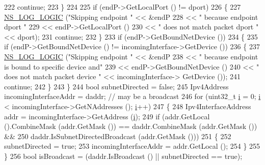\begin{DoxyCode}
222           \textcolor{keywordflow}{continue};
223         \}
224 
225       \textcolor{keywordflow}{if} (endP->GetLocalPort () != dport) 
226         \{
227           \hyperlink{group__logging_ga88acd260151caf2db9c0fc84997f45ce}{NS\_LOG\_LOGIC} (\textcolor{stringliteral}{"Skipping endpoint "} << &endP
228                                              << \textcolor{stringliteral}{" because endpoint dport "}
229                                              << endP->GetLocalPort ()
230                                              << \textcolor{stringliteral}{" does not match packet dport "} << dport);
231           \textcolor{keywordflow}{continue};
232         \}
233       \textcolor{keywordflow}{if} (endP->GetBoundNetDevice ())
234         \{
235           \textcolor{keywordflow}{if} (endP->GetBoundNetDevice () != incomingInterface->GetDevice ())
236             \{
237               \hyperlink{group__logging_ga88acd260151caf2db9c0fc84997f45ce}{NS\_LOG\_LOGIC} (\textcolor{stringliteral}{"Skipping endpoint "} << &endP
238                                                  << \textcolor{stringliteral}{" because endpoint is bound to specific device and"}
239                                                  << endP->GetBoundNetDevice ()
240                                                  << \textcolor{stringliteral}{" does not match packet device "} << incomingInterface->
      GetDevice ());
241               \textcolor{keywordflow}{continue};
242             \}
243         \}
244       \textcolor{keywordtype}{bool} subnetDirected = \textcolor{keyword}{false};
245       Ipv4Address incomingInterfaceAddr = daddr;  \textcolor{comment}{// may be a broadcast}
246       \textcolor{keywordflow}{for} (uint32\_t \hyperlink{bernuolliDistribution_8m_a6f6ccfcf58b31cb6412107d9d5281426}{i} = 0; \hyperlink{bernuolliDistribution_8m_a6f6ccfcf58b31cb6412107d9d5281426}{i} < incomingInterface->GetNAddresses (); \hyperlink{bernuolliDistribution_8m_a6f6ccfcf58b31cb6412107d9d5281426}{i}++)
247         \{
248           Ipv4InterfaceAddress addr = incomingInterface->GetAddress (\hyperlink{bernuolliDistribution_8m_a6f6ccfcf58b31cb6412107d9d5281426}{i});
249           \textcolor{keywordflow}{if} (addr.GetLocal ().CombineMask (addr.GetMask ()) == daddr.CombineMask (addr.GetMask ()) &&
250               daddr.IsSubnetDirectedBroadcast (addr.GetMask ()))
251             \{
252               subnetDirected = \textcolor{keyword}{true};
253               incomingInterfaceAddr = addr.GetLocal ();
254             \}
255         \}
256       \textcolor{keywordtype}{bool} isBroadcast = (daddr.IsBroadcast () || subnetDirected == \textcolor{keyword}{true});

\end{DoxyCode}
